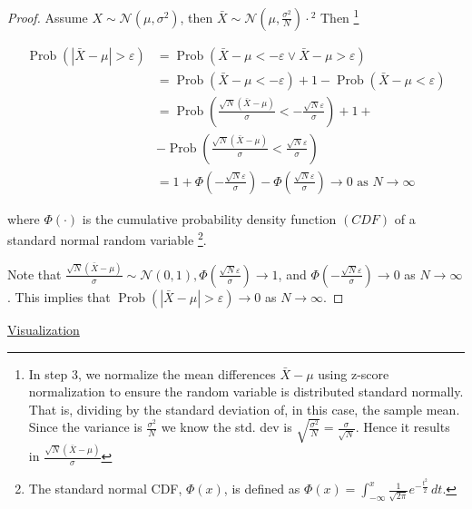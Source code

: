 \begin{proof}
    Assume $X \sim \mathcal{N}\left(\mu, \sigma^{2}\right)$, then $\bar{X} \sim \mathcal{N}\left(\mu, \frac{\sigma^{2}}{N}\right) \cdot{ }^{2}$ Then \footnote{In step 3, we normalize the mean differences $\bar{X} - \mu$ using z-score normalization to ensure the random variable is distributed standard normally. That is, dividing by the standard deviation of, in this case, the sample mean. Since the variance is $\frac{\sigma^2}{N}$ we know the std. dev is $\sqrt{\frac{\sigma^2}{N}} = \frac{\sigma}{\sqrt{N}}$. Hence it results in $\frac{\sqrt{N} (\bar{X}-\mu)}{\sigma}$}

    $$
    \begin{aligned}
    \operatorname{Prob}(|\bar{X}-\mu|>\varepsilon) & =\operatorname{Prob}(\bar{X}-\mu<-\varepsilon \vee \bar{X}-\mu>\varepsilon) \\
    & =\operatorname{Prob}(\bar{X}-\mu<-\varepsilon)+1-\operatorname{Prob}(\bar{X}-\mu<\varepsilon) \\
    & =\operatorname{Prob}\left(\frac{\sqrt{N}(\bar{X}-\mu)}{\sigma}<-\frac{\sqrt{N} \varepsilon}{\sigma}\right)+1+ \\
    & -\operatorname{Prob}\left(\frac{\sqrt{N}(\bar{X}-\mu)}{\sigma}<\frac{\sqrt{N} \varepsilon}{\sigma}\right) \\
    & =1+\Phi\left(-\frac{\sqrt{N} \varepsilon}{\sigma}\right)-\Phi\left(\frac{\sqrt{N} \varepsilon}{\sigma}\right) \longrightarrow 0 \text { as } N \longrightarrow \infty
    \end{aligned}
    $$
    
    where $\Phi(\cdot)$ is the cumulative probability density function $(C D F)$ of a standard normal random variable \footnote{The standard normal CDF, $\Phi(x)$, is defined as $\Phi(x) = \int_{-\infty}^{x} \frac{1}{\sqrt{2\pi}} e^{-\frac{t^2}{2}} \, dt$.}.

    Note that $\frac{\sqrt{N}(\bar{X}-\mu)}{\sigma} \sim \mathcal{N}(0,1), \Phi\left(\frac{\sqrt{N} \varepsilon}{\sigma}\right) \longrightarrow 1$, and $\Phi\left(-\frac{\sqrt{N} \varepsilon}{\sigma}\right) \longrightarrow 0$ as $N \longrightarrow \infty$. This implies that $\operatorname{Prob}(|\bar{X}-\mu|>\varepsilon) \longrightarrow 0$ as $N \longrightarrow \infty$.
\end{proof}

\href{https://www.statlect.com/asymptotic-theory/law-of-large-numbers}{Visualization}

